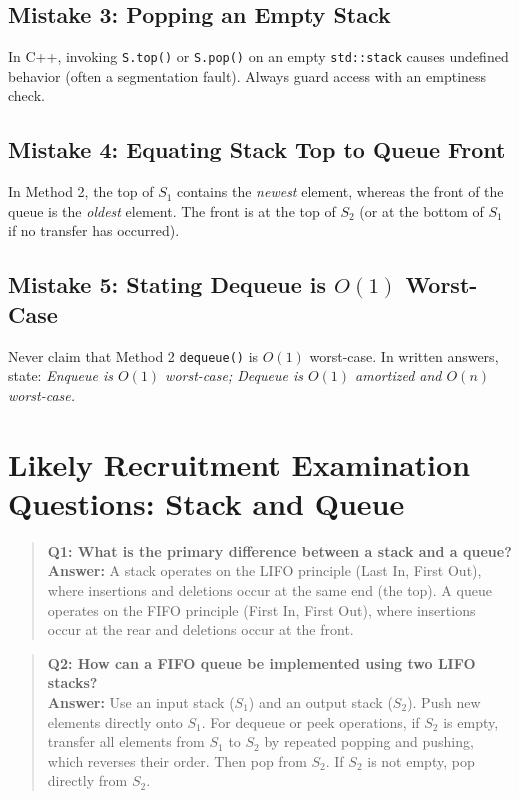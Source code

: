 \subsection{Mistake 3: Popping an Empty Stack}
In C++, invoking \texttt{S.top()} or \texttt{S.pop()} on an empty \texttt{std::stack} causes undefined behavior (often a segmentation fault). Always guard access with an emptiness check.

\subsection{Mistake 4: Equating Stack Top to Queue Front}
In Method 2, the top of $S_1$ contains the \emph{newest} element, whereas the front of the queue is the \emph{oldest} element. The front is at the top of $S_2$ (or at the bottom of $S_1$ if no transfer has occurred).

\subsection{Mistake 5: Stating Dequeue is $O(1)$ Worst-Case}
Never claim that Method 2 \texttt{dequeue()} is $O(1)$ worst-case. In written answers, state: \emph{Enqueue is $O(1)$ worst-case; Dequeue is $O(1)$ amortized and $O(n)$ worst-case.}

\section{Likely Recruitment Examination Questions: Stack and Queue}

\begin{quote}
\textbf{Q1: What is the primary difference between a stack and a queue?}\\
\textbf{Answer:} A stack operates on the LIFO principle (Last In, First Out), where insertions and deletions occur at the same end (the top). A queue operates on the FIFO principle (First In, First Out), where insertions occur at the rear and deletions occur at the front.
\end{quote}

\begin{quote}
\textbf{Q2: How can a FIFO queue be implemented using two LIFO stacks?}\\
\textbf{Answer:} Use an input stack ($S_1$) and an output stack ($S_2$). Push new elements directly onto $S_1$. For dequeue or peek operations, if $S_2$ is empty, transfer all elements from $S_1$ to $S_2$ by repeated popping and pushing, which reverses their order. Then pop from $S_2$. If $S_2$ is not empty, pop directly from $S_2$.
\end{quote}

